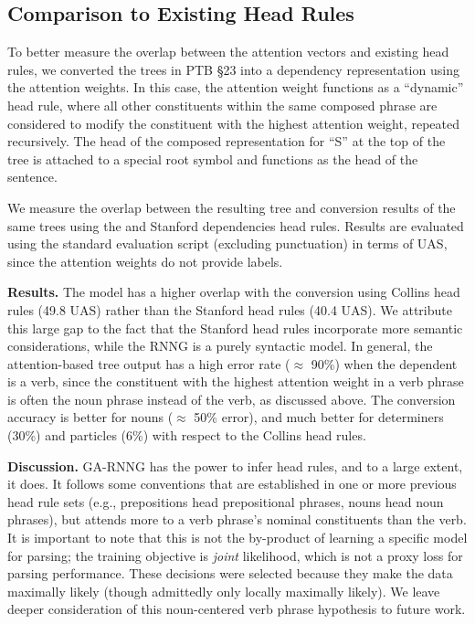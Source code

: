 \documentclass[11pt]{article}
\newcommand{\miguelcomment}[1]{\textcolor{red}{{\textbf{[#1 --\textsc{miguel}]}}}}
\renewcommand{\miguelcomment}[1]{}
\begin{document}
\subsection{Comparison to Existing Head Rules}

To better measure the overlap between the attention vectors and existing head rules, we converted the trees in PTB \S23 into a dependency representation using the attention weights. In this case, the attention weight functions as a ``dynamic'' head rule, where all other constituents within the same composed phrase are considered to modify the constituent with the highest attention weight, repeated recursively. The head of the composed representation for ``S'' at the top of the tree is attached to a special root symbol and functions as the head of the sentence. \miguelcomment{Also, see my comments about Stanford, Collins and Johansson's above... it seems that we are probably more similar to Johansson's. I sent the conversion tool months ago. Not sure if there is time to evaluate there.}

We measure the overlap between the resulting tree and conversion results of the same trees using the  and Stanford dependencies \cite{demarneffe-06} head rules. Results are evaluated using the standard evaluation script (excluding punctuation) in terms of UAS, since the attention weights do not provide labels.

\textbf{Results.} The model has a higher overlap with the conversion using Collins head rules (49.8 UAS) rather than the Stanford head rules (40.4 UAS). We attribute this large gap to the fact that the Stanford head rules incorporate more semantic considerations, while the RNNG is a purely syntactic model. In general, the attention-based tree output has a high error rate ($\approx$ 90\%) when the dependent is a verb, since the constituent with the highest attention weight in a verb phrase is often the noun phrase instead of the verb, as discussed above. The conversion accuracy is better for nouns ($\approx$ 50\% error), and much better for determiners (30\%) and particles (6\%) with respect to the Collins head rules.

\textbf{Discussion.}  GA-RNNG has the power to infer head rules, and to a large extent, it does.  It follows some conventions that are established in one or more previous head rule sets (e.g., prepositions head prepositional phrases, nouns head noun phrases), but attends more to a verb phrase's nominal constituents than the verb.  It is important to note that this is not the by-product of learning a specific model for parsing; the training objective is \emph{joint} likelihood, which is not a proxy loss for parsing performance.  These decisions were selected because they make the data maximally likely (though admittedly only locally maximally likely).  We leave deeper consideration of this noun-centered verb phrase hypothesis to future work.
\end{document}

